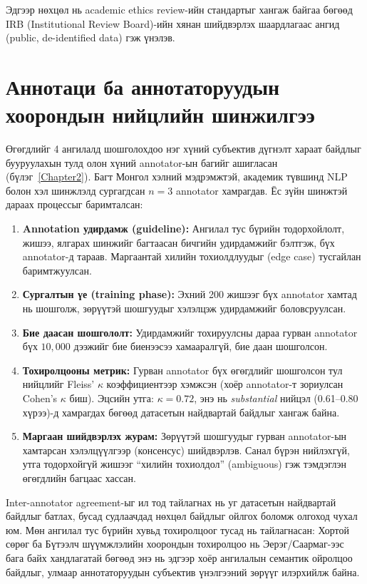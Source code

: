 Эдгээр нөхцөл нь academic ethics review-ийн стандартыг хангаж байгаа бөгөөд
IRB (Institutional Review Board)-ийн хянан шийдвэрлэх шаардлагаас ангид
(public, de-identified data) гэж үнэлэв.

\section{Аннотаци ба аннотаторуудын хоорондын нийцлийн шинжилгээ}

Өгөгдлийг 4 ангилалд шошголохдоо нэг хүний субъектив дүгнэлт хараат байдлыг
бууруулахын тулд олон хүний annotator-ын багийг ашигласан (бүлэг~\ref{Chapter2}).
Багт Монгол хэлний мэдрэмжтэй, академик түвшинд NLP болон хэл шинжлэлд сургагдсан
$n = 3$ annotator хамрагдав. Ёс зүйн шинжтэй дараах процессыг
баримталсан:

\begin{enumerate}
  \item \textbf{Annotation удирдамж (guideline):} Ангилал тус бүрийн
    тодорхойлолт, жишээ, ялгарах шинжийг багтаасан бичгийн удирдамжийг
    бэлтгэж, бүх annotator-д тараав. Маргаантай хилийн тохиолдлуудыг (edge
    case) тусгайлан баримтжуулсан.
  \item \textbf{Сургалтын үе (training phase):} Эхний 200 жишээг бүх
    annotator хамтад нь шошголж, зөрүүтэй шошгуудыг хэлэлцэж удирдамжийг
    боловсруулсан.
  \item \textbf{Бие даасан шошгололт:} Удирдамжийг тохируулсны дараа гурван
    annotator бүх $10{,}000$ дээжийг бие биенээсээ хамааралгүй, бие даан
    шошголсон.
  \item \textbf{Тохиролцооны метрик:} Гурван annotator бүх өгөгдлийг
    шошголсон тул нийцлийг Fleiss' $\kappa$ коэффициентээр хэмжсэн (хоёр
    annotator-т зориулсан Cohen's $\kappa$ биш). Эцсийн утга:
    $\kappa\!=\!0.72$, энэ нь \textit{substantial} нийцэл (0.61--0.80
    хүрээ)-д хамрагдах бөгөөд датасетын найдвартай байдлыг хангаж байна.
  \item \textbf{Маргаан шийдвэрлэх журам:} Зөрүүтэй шошгуудыг гурван
    annotator-ын хамтарсан хэлэлцүүлгээр (консенсус) шийдвэрлэв. Санал
    бүрэн нийлэхгүй, утга тодорхойгүй жишээг ``хилийн тохиолдол''
    (ambiguous) гэж тэмдэглэн өгөгдлийн багцаас хассан.
\end{enumerate}

Inter-annotator agreement-ыг ил тод тайлагнах нь уг датасетын найдвартай
байдлыг батлах, бусад судлаачдад нөхцөл байдлыг ойлгох боломж олгоход
чухал юм. Мөн ангилал тус бүрийн хувьд тохиролцоог тусад нь тайлагнасан:
Хортой сөрөг ба Бүтээлч шүүмжлэлийн хоорондын тохиролцоо нь Эерэг/Саармаг-ээс бага
байх хандлагатай бөгөөд энэ нь эдгээр хоёр ангилалын семантик ойролцоо байдлыг,
улмаар аннотаторуудын субъектив үнэлгээний зөрүүг илэрхийлж байна.

